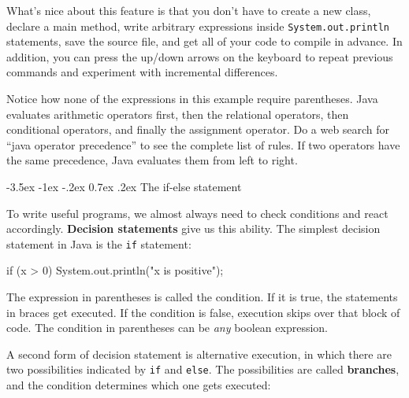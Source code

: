 \documentclass[12pt]{book}
\makeatletter
\theoremstyle{exercise}
\newcommand{\java}[1]{\verb"#1"}
\renewcommand{\section}{\@startsection {section}{1}{\z@}%
    {-3.5ex \@plus -1ex \@minus -.2ex}%
    {0.7ex \@plus.2ex}%
    {\normalfont\Large\bfseries}}
\newcommand{\java}[1]{\lstinline{#1}} %
\makeatother
\begin{document}
What's nice about this feature is that you don't have to create a new class, declare a main method, write arbitrary expressions inside \java{System.out.println} statements, save the source file, and get all of your code to compile in advance.
In addition, you can press the up/down arrows on the keyboard to repeat previous commands and experiment with incremental differences.


Notice how none of the expressions in this example require parentheses.
Java evaluates arithmetic operators first, then the relational operators, then conditional operators, and finally the assignment operator.
Do a web search for ``java operator precedence'' to see the complete list of rules.
If two operators have the same precedence, Java evaluates them from left to right.


\section{The if-else statement}


To write useful programs, we almost always need to check conditions and react accordingly.
{\bf Decision statements} give us this ability.
The simplest decision statement in Java is the \java{if} statement:

\begin{code}
    if (x > 0) {
        System.out.println("x is positive");
    }
\end{code}

The expression in parentheses is called the condition.
If it is true, the statements in braces get executed.
If the condition is false, execution skips over that block of code.
The condition in parentheses can be {\it any} boolean expression.


A second form of decision statement is alternative execution, in which there are two possibilities indicated by \java{if} and \java{else}.
The possibilities are called {\bf branches}, and the condition determines which one gets executed:

\end{document}
